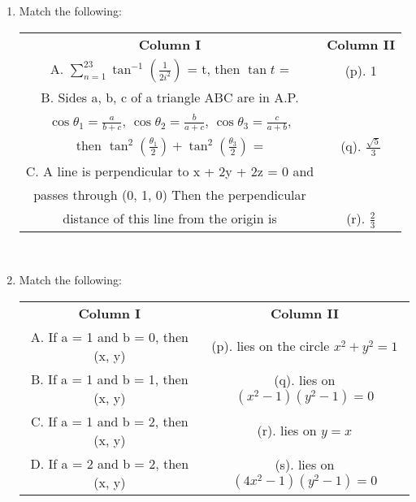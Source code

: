 \begin{enumerate}[label=\arabic*.,ref=\thesubsection.\theenumi]
\clearpage
\item Match the following:
\begin{table}[ht!]
\centering
\begin{tabular}{c c} 
\textbf{Column I} & \textbf{Column II}\\ [0.5ex] 
     A. $\sum_{n = 1}^{23} \tan^{-1}(\frac{1}{2i^{2}})$ = t, then $\tan t$ = &               (p). 1\\
     B. Sides a, b, c of a triangle ABC are in A.P.\\ $\cos \theta_1 = \frac{a}{b + c}$,
       $\cos \theta_2 = \frac{b}{a + c}$, $\cos \theta_3 = \frac{c}{a + b}$,\\ 
       then $\tan^2(\frac{\theta_1}{2}) + \tan^2(\frac{\theta_3}{2})$ = &                 (q). $\frac{\sqrt{5}}{3}$\\
     C. A line is perpendicular to x + 2y + 2z = 0 and\\ passes through (0, 1, 0) 
        Then the perpendicular\\ distance of this line from the origin is &               (r). $\frac{2}{3}$\\[1ex] 
\end{tabular}
\end{table}\\

\item Match the following:
\begin{table}[ht!]
\centering
\begin{tabular}{c c} 
 \textbf{Column I} & \textbf{Column II}\\ [0.5ex] 
 A. If a = 1 and b = 0, then (x, y)&                           (p). lies on the circle $x^2 +y^2=1$\\
 B. If a = 1 and b = 1, then (x, y)&                           (q). lies on $(x^2 - 1)(y^2 - 1) = 0$\\
 C. If a = 1 and b = 2, then (x, y)&                           (r). lies on $y = x$\\
 D. If a = 2 and b = 2, then (x, y)&                           (s). lies on $(4x^2 - 1)(y^2 - 1) = 0$\\[1ex] 
\end{tabular}
\end{table}\\


\end{enumerate}
